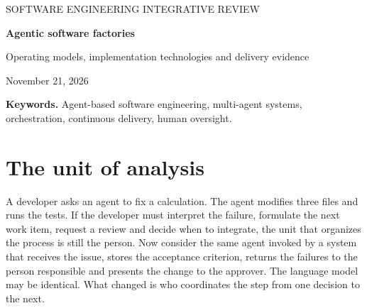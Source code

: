 \documentclass[11pt,a4paper]{article}
\begin{document}
\thispagestyle{plain}
{\small\sffamily\color{teal} SOFTWARE ENGINEERING \hfill INTEGRATIVE REVIEW}\par
\vspace{4mm}
{\LARGE\bfseries\color{ink} Agentic software factories\par}
\vspace{2mm}
{\Large Operating models, implementation technologies and delivery evidence\par}
\vspace{3mm}
{\small November 21, 2026}\par
\begin{abstract}
What work must a system take on for it to make sense to call it an \emph{agentic software factory}? This integrative review compares systems that develop from requirements, teams that resolve issues, and factories that maintain repositories in operation. The analysis identifies four coordination models according to the decision that links one unit of work to the next: a procedure between roles, planning by increments, a persistent board, and search guided by an operational signal. Human approval and accountability cut across all four models. The technologies observed in the studies are distinguished from the components that could be used to build a factory. The evidence spans controlled experiments with people, reproducible repository tests and industrial studies with different periods and denominators. The main gap is estimating the total human effort and the post-delivery quality under a common acceptance criterion. A comparative protocol is proposed, and the evidence matrices and two architecture diagrams are gathered at the end.
\end{abstract}
\noindent\small\textbf{Keywords.} Agent-based software engineering, multi-agent systems, orchestration, continuous delivery, human oversight.\normalsize

\section{The unit of analysis}
A developer asks an agent to fix a calculation. The agent modifies three files and runs the tests. If the developer must interpret the failure, formulate the next work item, request a review and decide when to integrate, the unit that organizes the process is still the person. Now consider the same agent invoked by a system that receives the issue, stores the acceptance criterion, returns the failures to the person responsible and presents the change to the approver. The language model may be identical. What changed is who coordinates the step from one decision to the next.
\end{document}
